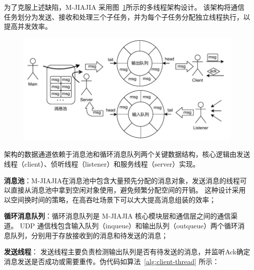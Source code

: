 {\begin{enumerate}[label=\arabic*.]
              为了克服上述缺陷，M-JIAJIA 采用图~\ref{fig:mjiajia-multithread}所示的多线程架构设计。
              该架构将通信任务划分为发送、接收和处理三个子任务，并为每个子任务分配独立线程执行，以提高并发效率。
              \begin{figure}[H]
                  \centering
                  \includegraphics[width=1.0\textwidth]{Img/多线程架构设计.drawio.pdf}
                  \label{fig:mjiajia-multithread}
              \end{figure}

              架构的数据通道依赖于消息池和循环消息队列两个关键数据结构，核心逻辑由发送线程（client）、侦听线程（listener）和服务线程（server）实现。

              \textbf{消息池}：M-JIAJIA在消息池中包含大量预先分配的消息对象，发送消息的线程可以直接从消息池中拿到空闲对象使用，避免频繁分配空间的开销。
              这种设计采用以空间换时间的策略，在高吞吐场景下可以大大提高消息组装的效率；

              \textbf{循环消息队列}：循环消息队列是 M-JIAJIA 核心模块层和通信层之间的通信渠道。
              UDP 通信栈包含输入队列（inqueue）和输出队列（outqueue）两个循环消息队列，分别用于存放接收到的消息和待发送的消息；

              \textbf{发送线程}： 发送线程主要负责检测输出队列是否有待发送的消息，并监听Ack确定消息发送是否成功或需要重传。伪代码如算法~\ref{alg:client-thread} 所示：


\end{enumerate}}
